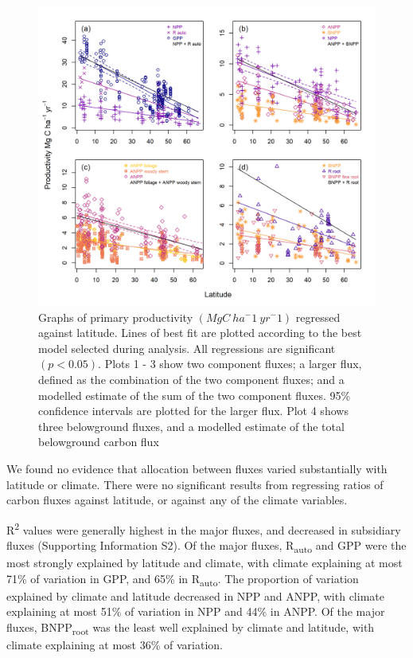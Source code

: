 \documentclass[]{article}
\begin{document}
\begin{figure}[H]
\includegraphics[width=1\linewidth]{combined_stacked} \caption{Graphs of primary productivity $(MgC~ha^-1~yr^-1)$ regressed against latitude. Lines of best fit are plotted according to the best model selected during analysis. All regressions are significant $(p<0.05)$. Plots 1 - 3 show two component fluxes; a larger flux, defined as the combination of the two component fluxes; and a modelled estimate of the sum of the two component fluxes. 95\% confidence intervals are plotted for the larger flux. Plot 4 shows three belowground fluxes, and a modelled estimate of the total belowground carbon flux}\label{fig:unnamed-chunk-7}
\end{figure}

We found no evidence that allocation between fluxes varied substantially
with latitude or climate. There were no significant results from
regressing ratios of carbon fluxes against latitude, or against any of
the climate variables.

R\textsuperscript{2} values were generally highest in the major fluxes,
and decreased in subsidiary fluxes (Supporting Information S2). Of the
major fluxes, R\textsubscript{auto} and GPP were the most strongly
explained by latitude and climate, with climate explaining at most 71\%
of variation in GPP, and 65\% in R\textsubscript{auto}. The proportion
of variation explained by climate and latitude decreased in NPP and
ANPP, with climate explaining at most 51\% of variation in NPP and 44\%
in ANPP. Of the major fluxes, BNPP\textsubscript{root} was the least
well explained by climate and latitude, with climate explaining at most
36\% of variation.
\end{document}
